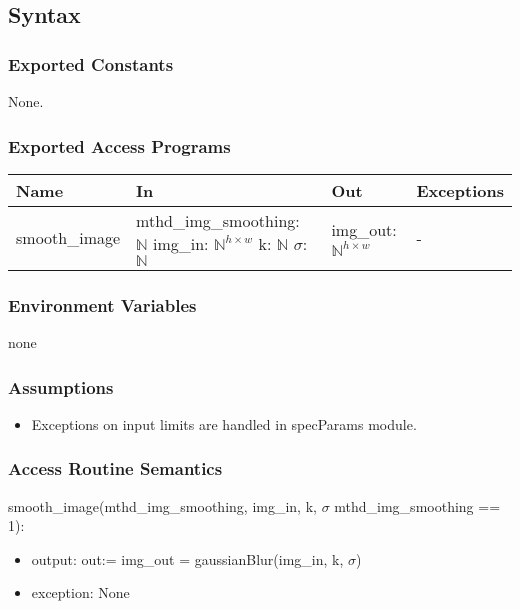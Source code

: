 \documentclass[12pt, titlepage]{article}
\begin{document}
\subsection{Syntax}
\subsubsection{Exported Constants}
None.
\subsubsection{Exported Access Programs}
\begin{center}
  \begin{tabular}{p{4cm} p{4.5cm} p{4cm} p{2cm}}
  \hline
  \textbf{Name} & \textbf{In} & \textbf{Out} & \textbf{Exceptions} \\
  \hline
  smooth\_image
  & mthd\_img\_smoothing: $\mathbb{N}$ \newline
  img\_in: $\mathbb{N}^{h \times w}$ \newline
  k: $\mathbb{N}$ \newline
  $\sigma$: $\mathbb{N}$
  & img\_out: $\mathbb{N}^{h \times w}$
  & - \\
  \hline
  \end{tabular}
  \end{center}

\subsubsection{Environment Variables}
none

\subsubsection{Assumptions}
  \begin{itemize}
  \item Exceptions on input limits are handled in specParams module.
  \end{itemize}

\subsubsection{Access Routine Semantics}

\noindent smooth\_image(mthd\_img\_smoothing, img\_in, 
k, $\sigma$ \textbar \: mthd\_img\_smoothing == 1):
\begin{itemize}
\item output: out:= img\_out = gaussianBlur(img\_in, 
  k, $\sigma$)
\item exception: None
\end{itemize}
\end{document}
